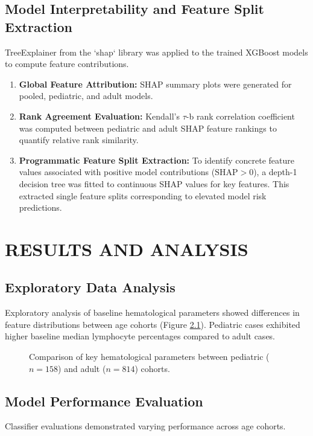 \documentclass[12pt, a4paper]{report}
\begin{document}
\section{Model Interpretability and Feature Split Extraction}
TreeExplainer from the `shap` library \cite{lundberg2017} was applied to the trained XGBoost models to compute feature contributions.
\begin{enumerate}
    \item \textbf{Global Feature Attribution:} SHAP summary plots were generated for pooled, pediatric, and adult models.
    \item \textbf{Rank Agreement Evaluation:} Kendall's $\tau$-b rank correlation coefficient was computed between pediatric and adult SHAP feature rankings to quantify relative rank similarity.
    \item \textbf{Programmatic Feature Split Extraction:} To identify concrete feature values associated with positive model contributions ($\text{SHAP} > 0$), a depth-1 decision tree was fitted to continuous SHAP values for key features. This extracted single feature splits corresponding to elevated model risk predictions.
\end{enumerate}

\chapter{RESULTS AND ANALYSIS}
\section{Exploratory Data Analysis}
Exploratory analysis of baseline hematological parameters showed differences in feature distributions between age cohorts (Figure \ref{fig:eda}). Pediatric cases exhibited higher baseline median lymphocyte percentages compared to adult cases.

\begin{figure}[htbp]
    \centering
    \caption{Comparison of key hematological parameters between pediatric ($n=158$) and adult ($n=814$) cohorts.}
    \label{fig:eda}
\end{figure}

\section{Model Performance Evaluation}
Classifier evaluations demonstrated varying performance across age cohorts.
\end{document}
